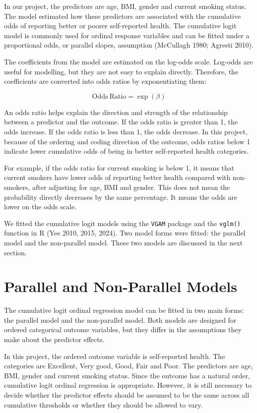 \documentclass{article}
\begin{document}
In our project, the predictors are age, BMI, gender and current smoking
status. The model estimated how these predictors are associated with the
cumulative odds of reporting better or poorer self-reported health. The
cumulative logit model is commonly used for ordinal response variables
and can be fitted under a proportional odds, or parallel slopes,
assumption (McCullagh 1980; Agresti 2010).

The coefficients from the model are estimated on the log-odds scale.
Log-odds are useful for modelling, but they are not easy to explain
directly. Therefore, the coefficients are converted into odds ratios by
exponentiating them:

\[
\mathrm{Odds\ Ratio} = \exp(\beta)
\]

An odds ratio helps explain the direction and strength of the
relationship between a predictor and the outcome. If the odds ratio is
greater than 1, the odds increase. If the odds ratio is less than 1, the
odds decrease. In this project, because of the ordering and coding
direction of the outcome, odds ratios below 1 indicate lower cumulative
odds of being in better self-reported health categories.

For example, if the odds ratio for current smoking is below 1, it means
that current smokers have lower odds of reporting better health compared
with non-smokers, after adjusting for age, BMI and gender. This does not
mean the probability directly decreases by the same percentage. It means
the odds are lower on the odds scale.

We fitted the cumulative logit models using the \texttt{VGAM} package
and the \texttt{vglm()} function in R (Yee 2010, 2015, 2024). Two model
forms were fitted: the parallel model and the non-parallel model. These
two models are discussed in the next section.

\section{Parallel and Non-Parallel
Models}\label{parallel-and-non-parallel-models}

The cumulative logit ordinal regression model can be fitted in two main
forms: the parallel model and the non-parallel model. Both models are
designed for ordered categorical outcome variables, but they differ in
the assumptions they make about the predictor effects.

In this project, the ordered outcome variable is self-reported health.
The categories are Excellent, Very good, Good, Fair and Poor. The
predictors are age, BMI, gender and current smoking status. Since the
outcome has a natural order, cumulative logit ordinal regression is
appropriate. However, it is still necessary to decide whether the
predictor effects should be assumed to be the same across all cumulative
thresholds or whether they should be allowed to vary.
\end{document}
